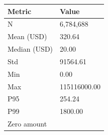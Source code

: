 \begin{tabular}{ll}
\toprule
Metric & Value \\
\midrule
N & 6,784,688 \\
Mean (USD) & 320.64 \\
Median (USD) & 20.00 \\
Std & 91564.61 \\
Min & 0.00 \\
Max & 115116000.00 \\
P95 & 254.24 \\
P99 & 1800.00 \\
Zero amount %
\bottomrule
\end{tabular}
